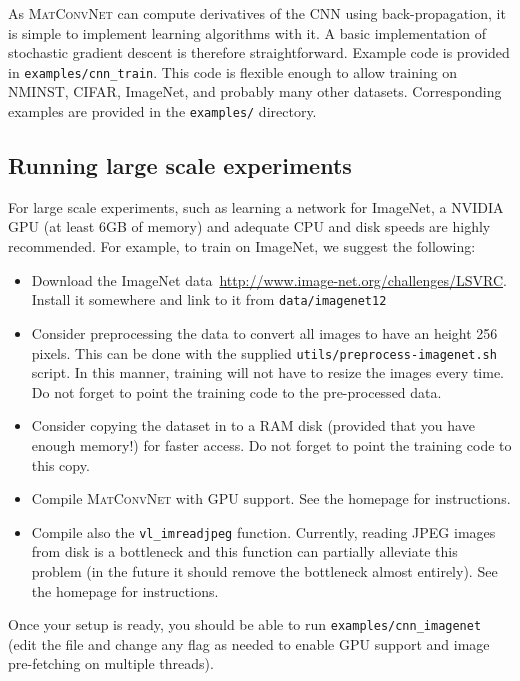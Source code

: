 \documentclass[12pt]{article}
\newcommand{\vlnn}{\textsc{MatConvNet}\xspace}
\begin{document}
As \vlnn can compute derivatives of the CNN using back-propagation, it is simple to implement learning algorithms with it. A basic implementation of stochastic gradient descent is therefore straightforward. Example code is provided in \verb!examples/cnn_train!. This code is flexible enough to allow training on NMINST, CIFAR, ImageNet, and probably many other datasets. Corresponding examples are provided in the \verb!examples/! directory.

\subsection{Running large scale experiments}

For large scale experiments, such as learning a network for ImageNet, a NVIDIA GPU (at least 6GB of memory) and adequate CPU and disk speeds are highly recommended. For example, to train on ImageNet, we suggest the following:
\begin{itemize}
\item Download the ImageNet data~\url{http://www.image-net.org/challenges/LSVRC}. Install it somewhere and link to it from \verb!data/imagenet12!
\item Consider preprocessing the data to convert all images to have an height 256 pixels. This can be done with the supplied \verb!utils/preprocess-imagenet.sh! script. In this manner, training will not have to resize the images every time. Do not forget to point the training code to the pre-processed data.
\item Consider copying the dataset in to a RAM disk (provided that you have enough memory!) for faster access. Do not forget to point the training code to this copy.
\item Compile \vlnn with GPU support. See the homepage for instructions.
\item Compile also the \verb!vl_imreadjpeg! function. Currently, reading JPEG images from disk is a bottleneck and this function can partially alleviate this problem (in the future it should remove the bottleneck almost entirely). See the homepage for instructions.
\end{itemize}

Once your setup is ready, you should be able to run \verb!examples/cnn_imagenet! (edit the file and change any flag as needed to enable GPU support and image pre-fetching on multiple threads).
\end{document}
